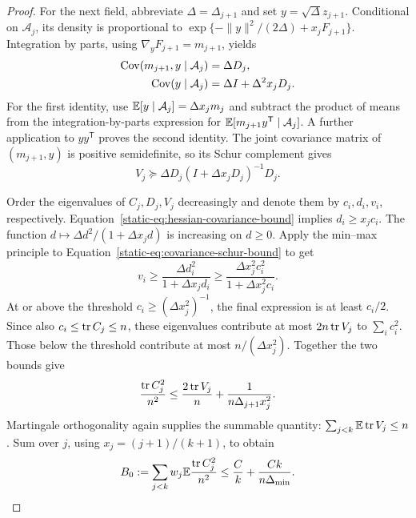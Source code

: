 \begin{proof}
For the next field, abbreviate $\Delta=\Delta_{j+1}$ and set
$y=\sqrt\Delta z_{j+1}$. Conditional on $\mathcal A_j$, its
density is proportional to
$\exp\{-\|y\|^2/(2\Delta)+x_jF_{j+1}\}$.
Integration by parts, using $\nabla_yF_{j+1}=m_{j+1}$, yields
\begin{align}
 \operatorname{Cov}(m_{j+1},y\mid\mathcal A_j)&=\Delta D_j,
 \label{static-eq:conditional-cross-covariance}\\
 \operatorname{Cov}(y\mid\mathcal A_j)&=\Delta I+\Delta^2x_jD_j.
 \label{static-eq:conditional-field-covariance}
\end{align}
For the first identity, use $\mathbb E[y\mid\mathcal A_j]=\Delta x_jm_j$
and subtract the product of means from the integration-by-parts
expression for $\mathbb E[m_{j+1}y^{\mathsf T}\mid\mathcal A_j]$.
A further application to $yy^{\mathsf T}$ proves the second identity.
The joint covariance matrix of $(m_{j+1},y)$ is positive semidefinite,
so its Schur complement gives
\begin{equation}\label{static-eq:covariance-schur-bound}
 V_j\succeq\Delta D_j(I+\Delta x_jD_j)^{-1}D_j.
\end{equation}

Order the eigenvalues of $C_j,D_j,V_j$ decreasingly and denote them
by $c_i,d_i,v_i$, respectively. Equation~\eqref{static-eq:hessian-covariance-bound}
implies $d_i\ge x_jc_i$. The function
$d\mapsto\Delta d^2/(1+\Delta x_jd)$ is increasing on $d\ge0$.
Apply the min--max principle to
Equation~\eqref{static-eq:covariance-schur-bound} to get
\[
 v_i\ge\frac{\Delta d_i^2}{1+\Delta x_jd_i}
      \ge\frac{\Delta x_j^2c_i^2}{1+\Delta x_j^2c_i}.
\]
At or above the threshold $c_i\ge(\Delta x_j^2)^{-1}$, the final
expression is at least $c_i/2$. Since also $c_i\le\operatorname{tr} C_j\le n$,
these eigenvalues contribute at most $2n\operatorname{tr} V_j$ to
$\sum_i c_i^2$. Those below the threshold contribute at most
$n/(\Delta x_j^2)$. Together the two bounds give
\begin{equation}\label{static-eq:conditional-square-trace}
 \frac{\operatorname{tr} C_j^2}{n^2}
 \le\frac{2\operatorname{tr} V_j}{n}
             +\frac1{n\Delta_{j+1}x_j^2}.
\end{equation}
Martingale orthogonality again supplies the summable quantity:
$\sum_{j<k}\mathbb E\operatorname{tr} V_j\le n$. Sum over $j$, using
$x_j=(j+1)/(k+1)$, to obtain
\begin{equation}\label{static-eq:average-square-trace}
 B_0:=\sum_{j<k}w_j\mathbb E\frac{\operatorname{tr} C_j^2}{n^2}
 \le\frac Ck+\frac{Ck}{n\Delta_{\min}}.
\end{equation}


\end{proof}
